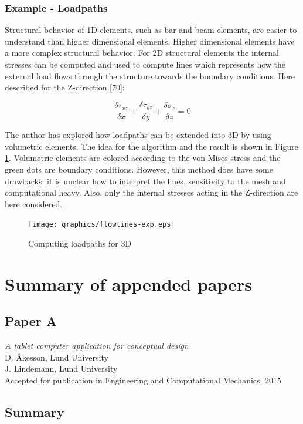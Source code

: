 \subsection{Example - Loadpaths}
Structural behavior of 1D elements, such as bar and beam elements, are easier to understand than higher dimensional elements. Higher dimensional elements have a more complex structural behavior. For 2D structural elements the internal stresses can be computed and used to compute lines which represents how the external load flows through the structure towards the boundary conditions. Here described for the Z-direction [70]:

\begin{equation*}
\frac{\delta \tau_{xz}}{\delta x} + \frac{\delta \tau_{yz}}{\delta y} + \frac{\delta \sigma_{z}}{\delta z}= 0
\end{equation*}

The author has explored how loadpaths can be extended into 3D by using volumetric elements. The idea for the algorithm and the result is shown in Figure \ref{fig:flowlines-exp}. Volumetric elements are colored according to the von Mises stress and the green dots are boundary conditions. However, this method does have some drawbacks; it is unclear how to interpret the lines, sensitivity to the mesh and computational heavy. Also, only the internal stresses acting in the Z-direction are here considered.
 
\begin{figure}
  \texttt{[image: graphics/flowlines-exp.eps]}
  \caption{Computing loadpaths for 3D}
  \label{fig:flowlines-exp}
\end{figure}



\chapter{Summary of appended papers}
\label{ch:Summary of appended papers}
\section{Paper A}
\textit{A tablet computer application for conceptual design} \\
D. Åkesson, Lund University \\
J. Lindemann, Lund University \\
Accepted for publication in Engineering and Computational Mechanics, 2015

\section*{Summary}

